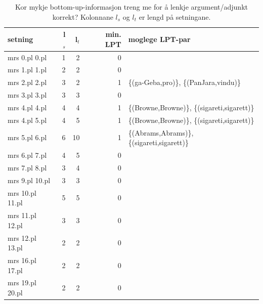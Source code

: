 \documentclass[12pt,a4paper,oneside,draft]{report}
\begin{document}
\begin{table}[htb]
\caption{\label{tbl:LPT}Kor mykje bottom-up-informasjon treng me for å lenkje argument/adjunkt korrekt? Kolonnane $l_s$ og $l_t$ er lengd på setningane.}
\begin{center}
\begin{tabular}{lrrrl}
 setning            &  l$_s$  &  l$_t$  &  min. LPT  &  moglege LPT-par                               \\
\hline
 mrs 0.pl 0.pl      &      1  &      2  &         0  &                                                \\
 mrs 1.pl 1.pl      &      2  &      2  &         0  &                                                \\
 mrs 2.pl 2.pl      &      3  &      2  &         1  &  \{(ga-Geba,pro)\}, \{(PanJara,vindu)\}        \\
 mrs 3.pl 3.pl      &      3  &      3  &         0  &                                                \\
 mrs 4.pl 4.pl      &      4  &      4  &         1  &  \{(Browne,Browne)\}, \{(sigareti,sigarett)\}  \\
 mrs 4.pl 5.pl      &      4  &      5  &         1  &  \{(Browne,Browne)\}, \{(sigareti,sigarett)\}  \\
 mrs 5.pl 6.pl      &      6  &     10  &         1  &  \{(Abrams,Abrams)\}, \{(sigareti,sigarett)\}  \\
 mrs 6.pl 7.pl      &      4  &      5  &         0  &                                                \\
 mrs 7.pl 8.pl      &      3  &      4  &         0  &                                                \\
 mrs 9.pl 10.pl     &      3  &      3  &         0  &                                                \\
 mrs 10.pl 11.pl    &      5  &      5  &         0  &                                                \\
 mrs 11.pl 12.pl    &      3  &      3  &         0  &                                                \\
 mrs 12.pl 13.pl    &      2  &      2  &         0  &                                                \\
 mrs 16.pl 17.pl    &      2  &      2  &         0  &                                                \\
 mrs 19.pl 20.pl    &      2  &      2  &         0  &                                                \\

\end{tabular}
\end{center}
\end{table}
\end{document}
